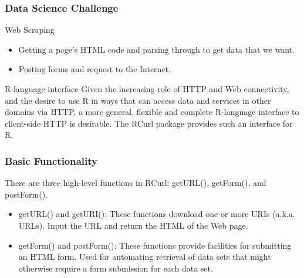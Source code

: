 \documentclass{beamer}
\begin{document}


%

\begin{frame}
\frametitle{Data Science Challenge}

\begin{block}{Web Scraping}
\begin{itemize}
\item Getting a page's HTML code and parsing through to get data that we want.
\item  Posting forms and request to the Internet.
\end{itemize}
\end{block}

\begin{block}{R-language interface}
Given the increasing role of HTTP and Web connectivity, and the desire to use R in ways that can access data and services in other domains via HTTP, a more general, flexible and complete R-language interface to client-side HTTP is desirable. The RCurl package provides such an interface for R. 
\end{block}



\end{frame}


\begin{frame}
\frametitle{Basic Functionality}
There are three high-level functions in RCurl: getURL(), getForm(), and postForm().

\begin{itemize}
\item  getURL() and getURI(): These functions download one or more URIs (a.k.a. URLs). Input the URL and return the HTML of the Web page.
\medskip
\item getForm() and postForm(): These functions provide facilities for submitting an HTML form. Used for automating retrieval of data sets that might otherwise require a form submission for each data set.
\end{itemize}
\end{frame}
\end{document}
